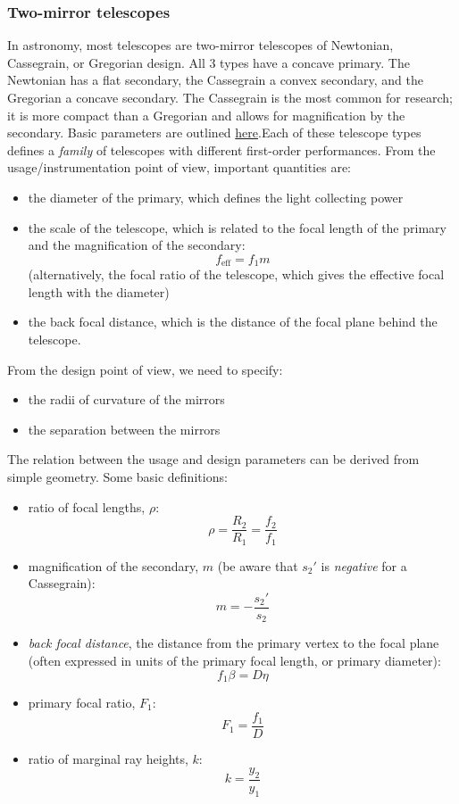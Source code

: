 \documentclass[12pt]{article}
\begin{document}
\subsubsection{Two-mirror telescopes}
In astronomy, most telescopes are two-mirror telescopes of Newtonian,
Cassegrain, or Gregorian design. All 3 types have a concave primary. The
Newtonian has a flat secondary, the Cassegrain a convex secondary, and the
Gregorian a concave secondary. The Cassegrain is the most common for research;
it is more compact than a Gregorian and allows for magnification by the
secondary. Basic parameters are outlined \href{http://astronomy.nmsu.edu/holtz/a535/html/diagrams/a535/cassegra.htm}
{here}.Each of these telescope types defines a \textit{family} of telescopes
with different first-order performances. From the usage/instrumentation point
of view, important quantities are:
\begin{itemize}
    \item the diameter of the primary, which defines the light
        collecting power
    \item the scale of the telescope, which is related to the focal
        length of the primary and the magnification of the secondary:
        \[
            f_{\textrm{eff}} = f_{1}m
            \]
        (alternatively, the focal ratio of the telescope, which gives
        the effective focal length with the diameter)
    \item the back focal distance, which is the distance of the focal
        plane behind the telescope.
\end{itemize}
From the design point of view, we need to specify:
\begin{itemize}
    \item the radii of curvature of the mirrors
    \item the separation between the mirrors
\end{itemize}
The relation between the usage and design parameters can be derived
from simple geometry. Some basic definitions:
\begin{itemize}
    \item ratio of focal lengths, $\rho$:
        \[
            \rho = \frac{R_{2}}{R_{1}} = \frac{f_{2}}{f_{1}}
            \]
    \item magnification of the secondary, $m$ (be aware that $s_{2}'$ is
        \emph{negative} for a Cassegrain):
        \[
            m = -\frac{s_{2}'}{s_{2}}
            \]
    \item \textit{back focal distance}, the distance from the primary vertex to
        the focal plane (often expressed in units of the primary focal length,
        or primary diameter):
        \[
            f_{1}\beta = D\eta
            \]
    \item primary focal ratio, $F_{1}$:
        \[
            F_{1} = \frac{f_{1}}{D}
            \]
    \item ratio of marginal ray heights, $k$:
        \[
            k = \frac{y_{2}}{y_{1}}
            \]
\end{itemize}
\end{document}
